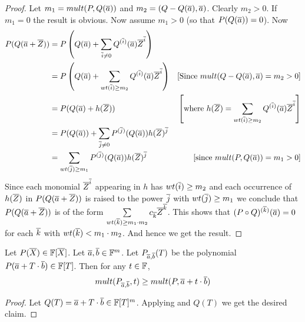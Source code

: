 \begin{proof}
	Let $m_1=mult(P,Q(\overline{a}))$ and $m_2=(Q-Q(\overline{a}),\overline{a})$. Clearly $m_2>0$. If $m_1=0$ the result is obvious. Now assume $m_1>0$ (so that $P(Q(\overline{a}))=0$). Now\begin{align*}
		P(Q(\overline{a}+\overline{Z})) & = P\left(Q(\overline{a})+\sum_{\overline{i}\neq 0}Q^{(\overline{i})}(\overline{a})\overline{Z}^{\overline{i}}  \right)\\
		& = P\left(Q(\overline{a})+\sum_{wt(\overline{i})\geq m_2}Q^{(\overline{i})}(\overline{a})\overline{Z}^{\overline{i}}  \right)  & [\text{Since $mult(Q-Q(\overline{a}),\overline{a})=m_2>0$}]\\
		& = P(Q(\overline{a})+h(\overline{Z})) & \left[\text{where $h(\overline{Z})=\sum\limits_{wt(\overline{i})\geq m_2}Q^{(\overline{i})}(\overline{a})\overline{Z}^{\overline{i}}$}  \right]\\
		& = P(Q(\overline{a}))+\sum_{\overline{j}\neq 0}P^{(\overline{j})}(Q(\overline{a}))h(\overline{Z})^{\overline{j}}\\
		& = \sum_{wt(\overline{j})\geq m_1}P^{(\overline{j})}(Q(\overline{a}))h(\overline{Z})^{\overline{j}} & [\text{since $mult(P,Q(\overline{a}))=m_1>0$}]
	\end{align*}
	Since each monomial $\overline{Z}^{\overline{i}}$ appearing in $h$ has $wt(\overline{i})\geq m_2$ and each occurrence of $h(\overline{Z})$ in $P(Q(\overline{a}+\overline{Z}))$ is raised to the power $\overline{j}$ with $wt(\overline{j})\geq m_1$ we conclude that $P(Q(\overline{a}+\overline{Z}))$ is of the form $\sum\limits_{wt(\overline{k})\geq m_1\cdot m_2}c_{\overline{k}}\overline{Z}^{\overline{k}}$. This shows that $(P\circ Q)^{(\overline{k})}(\overline{a})=0$ for each $\overline{k}$ with $wt(\overline{k})<m_1\cdot m_2$. And hence we get the result.
\end{proof}
\begin{corollary}\label{chvarmult}
	Let $P(\overline{X})\in \mathbb{F}[\overline{X}]$. Let $\overline{a},\overline{b}\in \mathbb{F}^m$. Let $P_{\overline{a},\overline{b}}(T)$ be the polynomial $P(\overline{a}+T\cdot \overline{b})\in \mathbb{F}[T]$. Then for any $t\in \mathbb{F}$, $$mult(P_{\overline{a},\overline{b}},t)\geq mult(P,\overline{a}+t\cdot \overline{b})$$
\end{corollary}
\begin{proof}
	Let $Q(T)=\overline{a}+T\cdot \overline{b}\in \mathbb{F}[T]^m$. Applying  and $Q(T)$ we get the desired claim. 
\end{proof}
